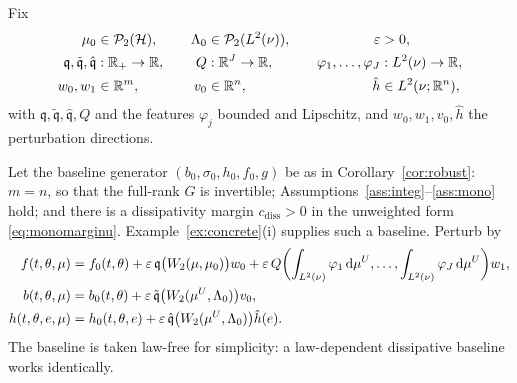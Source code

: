 \begin{example}\label{ex:fulllaw}
Fix
\[
\begin{aligned}
\mu_0&\in\mathcal P_2(\mathcal H), &\quad \Lambda_0&\in\mathcal P_2(L^2(\nu)),
&\quad \varepsilon&>0,\\
\mathfrak q,\tilde{\mathfrak q},\hat{\mathfrak q}&:\mathbb{R}_+\to\mathbb{R}, &\quad Q&:\mathbb{R}^J\to\mathbb{R},
&\quad \varphi_1,\dots,\varphi_J&:L^2(\nu)\to\mathbb{R},\\
w_0,w_1&\in\mathbb{R}^m, &\quad v_0&\in\mathbb{R}^n, &\quad \hat h&\in L^2(\nu;\mathbb{R}^n),
\end{aligned}
\]
with $\mathfrak q,\tilde{\mathfrak q},\hat{\mathfrak q},Q$ and the features $\varphi_j$ bounded and Lipschitz, and
$w_0,w_1,v_0,\hat h$ the perturbation directions.

Let the baseline generator $(b_0,\sigma_0,h_0,f_0,g)$ be as in Corollary~\ref{cor:robust}:
$m=n$, so that the full-rank $G$ is invertible; Assumptions~\ref{ass:integ}--\ref{ass:mono}
hold; and there is a dissipativity margin $c_{\mathrm{diss}}>0$ in the unweighted form
\eqref{eq:monomarginu}. Example~\ref{ex:concrete}(i) supplies such a baseline. Perturb by
\begin{align*}
f(t,\theta,\mu)&=f_0(t,\theta)+\varepsilon\,\mathfrak q\bigl(W_2(\mu,\mu_0)\bigr)w_0
+\varepsilon\,Q\biggl(\int_{L^2(\nu)}\varphi_1\,\mathrm{d}\mu^U,\dots,\int_{L^2(\nu)}\varphi_J\,\mathrm{d}\mu^U\biggr)w_1,\\
b(t,\theta,\mu)&=b_0(t,\theta)+\varepsilon\,\tilde{\mathfrak q}\bigl(W_2(\mu^U,\Lambda_0)\bigr)v_0,\\
h(t,\theta,e,\mu)&=h_0(t,\theta,e)+\varepsilon\,\hat{\mathfrak q}\bigl(W_2(\mu^U,\Lambda_0)\bigr)\hat h(e) .
\end{align*}
The baseline is taken law-free for simplicity: a law-dependent dissipative baseline
works identically.


\end{example}
